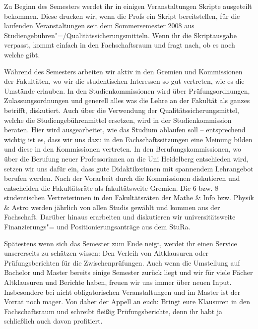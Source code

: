Zu Beginn des Semesters werdet ihr in einigen Veranstaltungen Skripte ausgeteilt bekommen. Diese drucken wir, wenn die Profs ein Skript bereitstellen, für die laufenden Veranstaltungen seit dem Sommersemester 2008 aus Studiengebühren"=/Qualitätssicherungsmitteln. Wenn ihr die Skriptausgabe verpasst, kommt einfach in den Fachschaftsraum und fragt nach, ob es noch welche gibt.

Während des Semesters arbeiten wir aktiv in den Gremien und Kommissionen der Fakultäten, wo wir die studentischen Interessen so gut vertreten, wie es die Umstände erlauben. In den Studienkommissionen wird über Prüfungsordnungen, Zulassungsordnungen und generell alles was die Lehre an der Fakultät als ganzes betrifft, diskutiert. Auch über die Verwendung der Qualitätssicherungsmittel, welche die Studiengebührenmittel ersetzen, wird in der Studienkommission beraten. Hier wird ausgearbeitet, wie das Studium ablaufen soll -- entsprechend wichtig ist es, dass wir uns dazu in den Fachschaftssitzungen eine Meinung bilden und diese in den Kommissionen vertreten. In den Berufungskommissionen, wo über die Berufung neuer Professorinnen an die Uni Heidelberg entschieden wird, setzen wir uns dafür ein, dass gute Didaktikerinnen mit spannendem Lehrangebot berufen werden. Nach der Vorarbeit durch die Kommissionen diskutieren und entscheiden die Fakultätsräte als fakultätsweite Gremien. Die 6 bzw. 8 studentischen Vertreterinnen in den Fakultätsräten der Mathe \& Info bzw. Physik \& Astro werden jährlich von allen Studis gewählt und kommen aus der Fachschaft. Darüber hinaus erarbeiten und diskutieren wir universitätsweite Finanzierungs"= und Positionierungsanträge aus dem \gls{StuRa}.

Spätestens wenn sich das Semester zum Ende neigt, werdet ihr einen Service unsererseits zu schätzen wissen: Den Verleih von Altklausuren oder Prüfungsberichten für die Zwischenprüfungen. Auch wenn die Umstellung auf Bachelor und Master bereits einige Semester zurück liegt und wir für viele Fächer Altklausuren und Berichte haben, freuen wir uns immer über neuen Input. Insbesondere bei nicht obligatorischen Veranstaltungen und im Master ist der Vorrat noch mager. Von daher der Appell an euch: Bringt eure Klausuren in den Fachschaftsraum und schreibt fleißig Prüfungsberichte, denn ihr habt ja schließlich auch davon profitiert.


